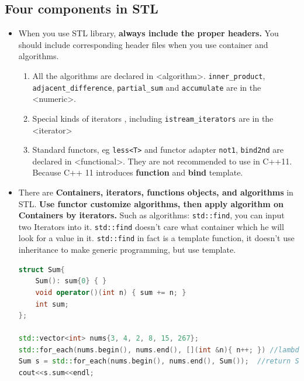 \documentclass[a4paper,11pt,twoside]{book}
\begin{document}
\subsection{Four components in STL}
\begin{itemize}
\item When you use STL library, \textbf{always include the proper headers.} You should include corresponding header files when you use container and algorithms.
\begin{enumerate}

\item All the algorithms are declared in <algorithm>. \texttt{inner\_product}, \texttt{adjacent\_difference}, \texttt{partial\_sum} and \texttt{accumulate} are in the <numeric>.

\item Special kinds of iterators , including \texttt{istream\_iterators} are in the <iterator>

\item Standard functors, eg \texttt{less<T>} and functor adapter \texttt{not1}, \texttt{bind2nd} are declared in <functional>. They are not recommended to use in C++11. Because C++ 11 introduces \textbf{function} and \textbf{bind} template.

\end{enumerate}

\item There are \textbf{Containers, iterators, functions objects, and algorithms} in STL. \textbf{Use functor customize algorithms, then apply algorithm on Containers by iterators.} Such as algorithms: \texttt{std::find}, you can input two Iterators into it.  \texttt{std::find} doesn't care what container which he will look for a value in it.  \texttt{std::find} in fact is a template function, it doesn't use inheritance to make generic programming, but use template.  

\begin{lstlisting}[frame=single, language=c++]
struct Sum{
    Sum(): sum{0} { }
    void operator()(int n) { sum += n; }
    int sum;
};

std::vector<int> nums{3, 4, 2, 8, 15, 267};
std::for_each(nums.begin(), nums.end(), [](int &n){ n++; }) //lambda syntax
Sum s = std::for_each(nums.begin(), nums.end(), Sum());  //return Sum struct
cout<<s.sum<<endl;
\end{lstlisting}

\end{itemize}
\end{document}
